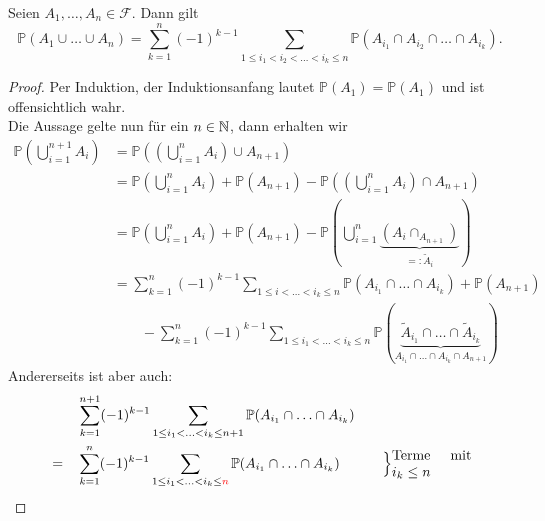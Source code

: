 \begin{corollary}
    Seien $A_1,\ldots,A_n \in \mathcal{F}$. Dann gilt
    \[
        \mathbb{P}(A_1 \cup \ldots \cup A_n) = \sum_{k=1}^{n} (-1)^{k-1} \sum_{1\leq i_1<i_2<\ldots<i_k \leq n} \mathbb{P}(A_{i_1} \cap A_{i_2} \cap \ldots \cap A_{i_k})
    .\] 
\end{corollary}
\begin{proof}
    Per Induktion, der Induktionsanfang lautet  $\mathbb{P}(A_1) = \mathbb{P}(A_1)$ und ist offensichtlich wahr. \\
    Die Aussage gelte nun für ein $n\in \mathbb{N}$, dann erhalten wir
    \begin{equation}
        \begin{split}
            \mathbb{P}\left( \bigcup_{i=1}^{n+1} A_i \right)  &= \mathbb{P}\left( \left(\bigcup_{i=1}^{n}A_i \right) \cup A_{n+1}\right)  \\
                                                              &= \mathbb{P}\left(\bigcup_{i=1}^{n} A_i\right) + \mathbb{P}(A_{n+1}) - \mathbb{P}\left( \left( \bigcup_{i=1}^n A_i \right) \cap A_{n+1} \right)  \\
                                                              &= \mathbb{P}\left( \bigcup_{i=1}^{n} A_i \right)  + \mathbb{P}(A_{n+1}) - \mathbb{P}\left( \bigcup_{i=1}^n \underbrace{(A_i \cap _{A_{n+1}})}_{=: \tilde{A}_i} \right)  \\
                                                              &= \sum_{k=1}^{n} (-1)^{k-1} \sum_{1\leq i<\ldots<i_k \leq n} \mathbb{P}(A_{i_1} \cap \ldots \cap A_{i_k}) + \mathbb{P}(A_{n+1}) \\
                                                              &\qquad -\sum_{k=1}^n (-1)^{k-1} \sum_{1\leq i_1 < \ldots < i_k \leq n} \mathbb{P}(\underbrace{\tilde{A}_{i_1} \cap \ldots \cap \tilde{A}_{i_k}}_{A_{i_1} \cap \ldots \cap A_{i_k} \cap A_{n+1}})
        \end{split}
    \end{equation}
    Andererseits ist aber auch:
    \begin{alignat*}{5}
           &\quad&  &\sum_{k=1} ^{n+1} (-1)^{k-1} \sum_{1\leq i_1<\ldots<i_k \leq  n+1} \mathbb{P}(A_{i_1} \cap \ldots \cap A_{i_k}) &\quad & \\
           &= & &\sum\limits_{k=1}^{n}(-1)^{k-1} \sum\limits_{1\leq i_1< \ldots < i_k \leq  \color{red} n} \mathbb{P}(A_{i_1} \cap \ldots \cap A_{i_k}) & \quad &\Big\}\text{\parbox{2cm}{Terme mit $i_k\leq n$}} \\

\end{alignat*}
\end{proof}
